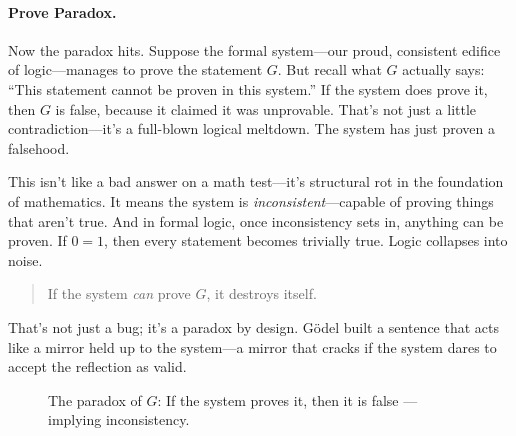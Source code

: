 \vspace{1em}


\paragraph{Prove Paradox.} Now the paradox hits. Suppose the formal system—our proud, consistent edifice of logic—manages to prove the statement \( G \). But recall what \( G \) actually says: “This statement cannot be proven in this system.” If the system does prove it, then \( G \) is false, because it claimed it was unprovable. That’s not just a little contradiction—it’s a full-blown logical meltdown. The system has just proven a falsehood. 

This isn’t like a bad answer on a math test—it’s structural rot in the foundation of mathematics. It means the system is \emph{inconsistent}—capable of proving things that aren’t true. And in formal logic, once inconsistency sets in, anything can be proven. If \( 0 = 1 \), then every statement becomes trivially true. Logic collapses into noise.

\begin{quote}
If the system \emph{can} prove \( G \), it destroys itself. 
\end{quote}

That’s not just a bug; it’s a paradox by design. Gödel built a sentence that acts like a mirror held up to the system—a mirror that cracks if the system dares to accept the reflection as valid.



\vspace{1em}

\begin{figure}[H]
\centering
{}
\caption{The paradox of \( G \): If the system proves it, then it is false — implying inconsistency.}
\end{figure}

